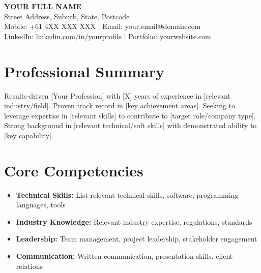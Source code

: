 \documentclass[11pt,a4paper]{article}
\begin{document}
\begin{center}
    \textbf{\Large YOUR FULL NAME} \\
    \vspace{0.5em}
    Street Address, Suburb, State, Postcode \\
    Mobile: +61 4XX XXX XXX $|$ Email: your.email@domain.com \\
    LinkedIn: linkedin.com/in/yourprofile $|$ Portfolio: yourwebsite.com
\end{center}

\section{Professional Summary}
Results-driven [Your Profession] with [X] years of experience in [relevant industry/field]. Proven track record in [key achievement areas]. Seeking to leverage expertise in [relevant skills] to contribute to [target role/company type]. Strong background in [relevant technical/soft skills] with demonstrated ability to [key capability].

\section{Core Competencies}
\begin{itemize}[leftmargin=0.5cm, rightmargin=0.5cm]
    \item \textbf{Technical Skills:} List relevant technical skills, software, programming languages, tools
    \item \textbf{Industry Knowledge:} Relevant industry expertise, regulations, standards
    \item \textbf{Leadership:} Team management, project leadership, stakeholder engagement
    \item \textbf{Communication:} Written communication, presentation skills, client relations
\end{itemize}

\end{document}
